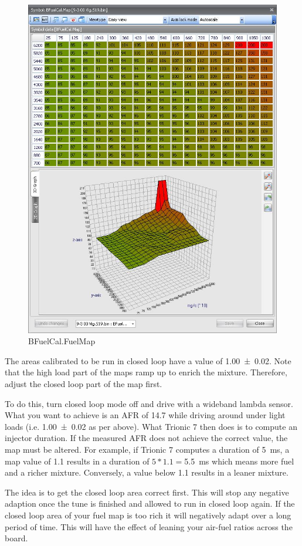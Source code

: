 \documentclass[11pt,a4paper]{book}
\begin{document}
\begin{figure}
    \centering
    \includegraphics[width=.9\linewidth]{fuelmap.png}
    \caption{BFuelCal.FuelMap}
    \label{fig:fuelmap}
\end{figure}

The areas calibrated to be run in closed loop have a value of \num{1.00(2)}.
Note that the high load part of the maps ramp up to enrich the mixture.
Therefore, adjust the closed loop part of the map first.

To do this, turn closed loop mode off and drive with a wideband lambda sensor.
What you want to achieve is an AFR of 14.7 while driving around under light
loads (i.e. \num{1.00(2)} as per above). What Trionic 7 then does is to compute
an injector duration. If the measured AFR does not achieve the correct value,
the map must be altered. For example, if Trionic 7 computes a duration of
\SI{5}{\milli\second}, a map value of \num{1.1} results in a duration of
$5*1.1=$\SI{5.5}{\milli\second} which means more fuel and a richer mixture.
Conversely, a value below \num{1.1} results in a leaner mixture.

The idea is to get the closed loop area correct first. This will stop any
negative adaption once the tune is finished and allowed to run in closed loop
again. If the closed loop area of your fuel map is too rich it will negatively
adapt over a long period of time. This will have the effect of leaning your
air-fuel ratios across the board.
\end{document}
